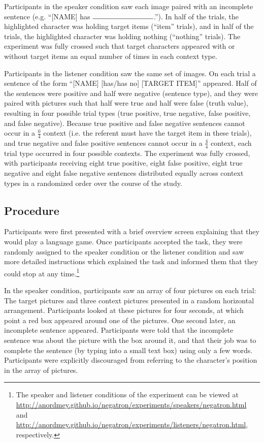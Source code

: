 \documentclass[man, floatsintext, noapacite]{apa6}
\begin{document}
Participants in the speaker condition saw each image paired with an incomplete sentence (e.g. ``[NAME] has $\rule{3cm}{0.15mm}$.''). In half of the trials, the highlighted character was holding target items (``item'' trials), and in half of the trials, the highlighted character was holding nothing (``nothing'' trials).  The experiment was fully crossed such that target characters appeared with or without target items an equal number of times in each context type.  

Participants in the listener condition saw the same set of images.  On each trial a sentence of the form ``[NAME] [has/has no] [TARGET ITEM]'' appeared.  Half of the sentences were positive and half were negative (sentence type), and they were paired with pictures such that half were true and half were false (truth value), resulting in four possible trial types (true positive, true negative, false positive, and false negative).  Because true positive and false negative sentences cannot occur in a $\frac{0}{4}$ context (i.e. the referent must have the target item in these trials), and true negative and false positive sentences cannot occur in a $\frac{4}{4}$ context, each trial type occurred in four possible contexts.  The experiment was fully crossed, with participants receiving eight true positive, eight false positive, eight true negative and eight false negative sentences distributed equally across context types in a randomized order over the course of the study.  

\subsection{Procedure}

Participants were first presented with a brief overview screen explaining that they would play a language game.  Once participants accepted the task, they were randomly assigned to the speaker condition or the listener condition and saw more detailed instructions which explained the task and informed them that they could stop at any time.\footnote{The speaker and listener conditions of the experiment can be viewed at \url{http://anordmey.github.io/negatron/experiments/speakers/negatron.html} and \url{http://anordmey.github.io/negatron/experiments/listeners/negatron.html}, respectively.}

In the speaker condition, participants saw an array of four pictures on each trial: The target pictures and three context pictures presented in a random horizontal arrangement.  Participants looked at these pictures for four seconds, at which point a red box appeared around one of the pictures.  One second later, an incomplete sentence appeared. Participants were told that the incomplete sentence was about the picture with the box around it, and that their job was to complete the sentence (by typing into a small text box) using only a few words. Participants were explicitly discouraged from referring to the character's position in the array of pictures. 
\end{document}
